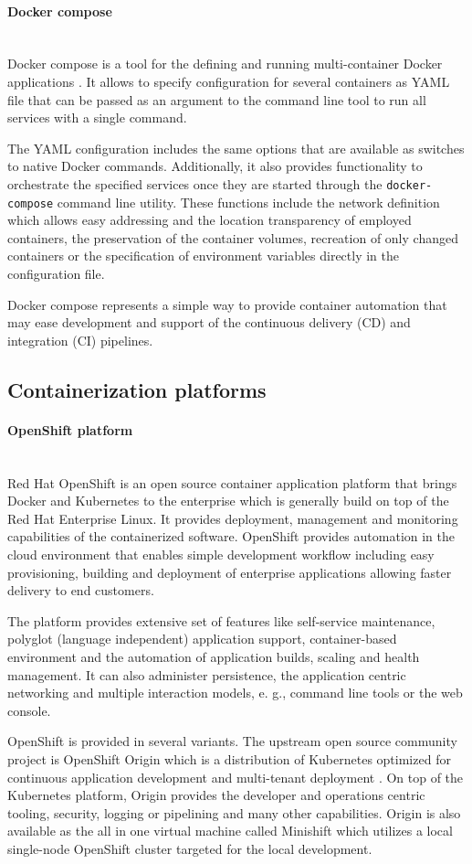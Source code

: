 \documentclass[oneside,
  digital, %
  table,   %
  lof,     %
  lot,     %
]{fithesis3}
\newcommand{\newlinepar}[1]{\paragraph{#1}\needspace{4\baselineskip}\mbox{}\\}
\begin{document}
\newlinepar{Docker compose}

Docker compose is a tool for the defining and running multi-container Docker applications \cite{docker_compose}. It allows to specify configuration for several containers as YAML file that can be passed as an argument to the command line tool to run all services with a single command.

The YAML configuration includes the same options that are available as switches to native Docker commands. Additionally, it also provides functionality to orchestrate the specified services once they are started through the \texttt{docker-compose} command line utility. These functions include the network definition which allows easy addressing and the location transparency of employed containers, the preservation of the container volumes, recreation of only changed containers or the specification of environment variables directly in the configuration file. 

Docker compose represents a simple way to provide container automation that may ease development and support of the continuous delivery (CD) and integration (CI) pipelines.


\subsection{Containerization platforms}

\newlinepar{OpenShift platform}

Red Hat OpenShift is an open source container application platform that  brings Docker and Kubernetes to the enterprise \cite{openshift} which is generally build on top of the Red Hat Enterprise Linux. It provides deployment, management and monitoring capabilities of the containerized software. OpenShift provides automation in the cloud environment that enables simple development workflow including easy provisioning, building and deployment of enterprise applications allowing faster delivery to end customers.

The platform provides extensive set of features like self-service maintenance, polyglot (language independent) application support, container-based environment and the automation of application builds, scaling and health management. It can also administer persistence, the application centric networking and multiple interaction models, e. g., command line tools or the web console.

OpenShift is provided in several variants. The upstream open source community project is OpenShift Origin which is a distribution of Kubernetes optimized for continuous application development and multi-tenant deployment \cite{openshift}. On top of the Kubernetes platform, Origin provides the developer and operations centric tooling, security, logging or pipelining and many other capabilities. Origin is also available as the all in one virtual machine called Minishift which utilizes a local single-node OpenShift cluster targeted for the local development. 
\end{document}

